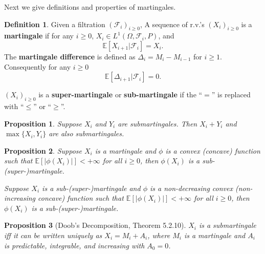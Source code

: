 \documentclass[openany]{book}
\newtheorem{proposition}{Proposition}[chapter]
\theoremstyle{definition}
\newtheorem{definition}{Definition}[chapter]
\theoremstyle{remark}
\begin{document}
Next we give definitions and properties of martingales.
\begin{definition}
    Given a filtration $(\mathcal{F}_i)_{i\ge0}$, A sequence of r.v.'s $(X_i)_{i\ge0}$ is a \textbf{martingale} if for any $i\ge0$, $X_i\in L^1(\Omega,\mathcal{F}_i,P)$, and
    \begin{equation*}
        \mathbb{E}[X_{i+1}|\mathcal{F}_i]=X_i.
    \end{equation*}
    The \textbf{martingale difference} is defined as $\Delta_i=M_i-M_{i-1}$ for $i\ge1$. Consequently for any $i\ge0$
    \begin{equation*}
        \mathbb{E}[\Delta_{i+1}|\mathcal{F}_i]=0.
    \end{equation*}

    $(X_i)_{i\ge0}$ is a \textbf{super-martingale} or \textbf{sub-martingale} if the ``$=$'' is replaced with ``$\le$'' or ``$\ge$''.
\end{definition}
\begin{proposition}
    Suppose $X_i$ and $Y_i$ are submartingales. Then $X_i+Y_i$ and $\max\{X_i,Y_i\}$ are also submartingales.
\end{proposition}
\begin{proposition}
    Suppose $X_i$ is a martingale and $\phi$ is a convex (concave) function such that $\mathbb{E}\left[|\phi(X_i)|\right]<+\infty$ for all $i\ge0$, then $\phi(X_i)$ is a sub-(super-)martingale.

    Suppose $X_i$ is a sub-(super-)martingale and $\phi$ is a non-decreasing convex (non-increasing concave) function such that $\mathbb{E}\left[|\phi(X_i)|\right]<+\infty$ for all $i\ge0$, then $\phi(X_i)$ is a sub-(super-)martingale.
\end{proposition}
\begin{proposition}[Doob's Decomposition, \cite{D10} Theorem 5.2.10]
    $X_i$ is a submartingale iff it can be written uniquely as $X_i=M_i+A_i$, where $M_i$ is a martingale and $A_i$ is predictable, integrable, and increasing with $A_0=0$.
\end{proposition}
\end{document}
